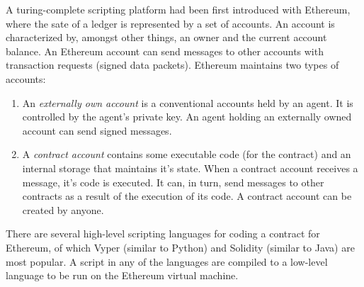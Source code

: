 
A turing-complete scripting platform had been first  introduced with Ethereum, 
where the sate of a ledger is represented by a set of accounts. An account is characterized by, amongst other things, an owner 
and the current account balance.
An Ethereum account can send messages to other accounts with transaction requests (signed data packets).
%
Ethereum maintains two types of accounts: 
\begin{enumerate}
	\item An {\em externally own account} is a conventional accounts held by an agent. It is  controlled by the agent's
		private key. An agent holding an externally owned account can send signed messages. 
	\item A {\em contract account} contains some executable code (for the contract) and an internal storage that maintains 
		it's state. When a contract account receives a message, it's code is executed. It can, in turn, send messages 
		to other contracts as a result of the execution of its code. A contract account can be created by anyone.
\end{enumerate}

  
There are several high-level scripting languages for coding a contract for Ethereum, of which Vyper (similar to Python) and Solidity
(similar to Java) are most popular. 
A script in any of the languages are compiled to a low-level language to be run on the Ethereum
virtual machine. 

%

